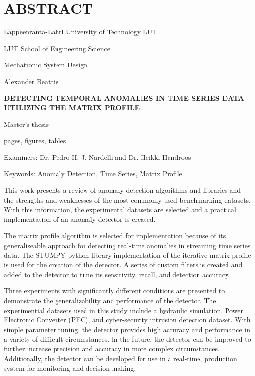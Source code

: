 \section*{\MakeUppercase{Abstract}}
{}%
\thispagestyle{empty}
\begin{singlespace} 
{
Lappeenranta-Lahti University of Technology LUT \bigskip

\parskip=0pt %

LUT School of Engineering Science \bigskip

Mechatronic System Design \bigskip

Alexander Beattie \bigskip \bigskip

\textbf{\MakeUppercase{Detecting Temporal Anomalies in Time Series Data}} \\
\textbf{\MakeUppercase{Utilizing the Matrix Profile}} \bigskip\bigskip

Master's thesis \bigskip

\the\year{} \bigskip

\pageref{LastPage} pages,  figures,  tables \bigskip

Examiners: Dr. Pedro H. J. Nardelli and Dr. Heikki Handroos \bigskip\bigskip

Keywords: Anomaly Detection, Time Series, Matrix Profile \bigskip
}

This work presents a review of anomaly detection algorithms and libraries and the strengths and weaknesses of the most commonly used benchmarking datasets. With this information, the experimental datasets are selected and a practical implementation of an anomaly detector is created.

The matrix profile algorithm is selected for implementation because of its generalizeable approach for detecting real-time anomalies in streaming time series data.
The STUMPY python library implementation of the iterative matrix profile is used for the creation of the detector.
A series of custom filters is created and added to the detector to tune its sensitivity, recall, and detection accuracy. 

Three experiments with significantly different conditions are presented to demonstrate the generalizability and performance of the detector.
The experimential datasets used in this study include a hydraulic simulation, Power Electronic Converter (PEC), and cyber-security intrusion detection dataset.
With simple parameter tuning, the detector provides high accuracy and performance in a variety of difficult circumstances.
In the future, the detector can be improved to further increase precision and accuracy in more complex circumstances.
Additionally, the detector can be developed for use in a real-time, production system for monitoring and decision making.
\end{singlespace}